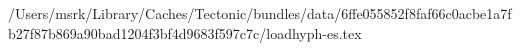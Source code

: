 /Users/msrk/Library/Caches/Tectonic/bundles/data/6ffe055852f8faf66c0acbe1a7fb27f87b869a90bad1204f3bf4d9683f597c7c/loadhyph-es.tex